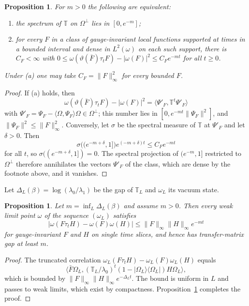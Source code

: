 \documentclass[aps,prd,twocolumn,superscriptaddress,nofootinbib,longbibliography,floatfix,amsmath,amssymb,10pt]{revtex4-2}
\newtheorem{proposition}[theorem]{Proposition}
\theoremstyle{definition}
\theoremstyle{remark}
\newcommand{\ip}[2]{\langle #1,#2\rangle}
\begin{document}
\begin{proposition}\label{prop:gapdecay}
For $m>0$ the following are equivalent:
\begin{enumerate}[label=\textup{(\alph*)},leftmargin=*]
\item the spectrum of $\mathbb T$ on $\Omega^\perp$ lies in $[0,e^{-m}]$;
\item for every $F$ in a class of gauge-invariant local functions supported
at times in a bounded interval and dense in $L^2(\omega)$ on each such support,
there is $C_F<\infty$ with $0\le\omega(\vartheta(\bar F)\tau_tF)-|\omega(F)|^2
\le C_Fe^{-mt}$ for all $t\ge0$.
\end{enumerate}
Under \textup{(a)} one may take $C_F=\|F\|_\infty^2$ for every bounded $F$.
\end{proposition}

\begin{proof}
If (a) holds, then
\[
\omega(\vartheta(\bar F)\tau_tF)-|\omega(F)|^2=\ip{\Psi'_F}{\mathbb
T^t\Psi'_F}
\]
with $\Psi'_F=\Psi_F-\ip\Omega{\Psi_F}\Omega\in\Omega^\perp$; this number lies
in $[0,e^{-mt}\|\Psi_F\|^2]$, and $\|\Psi_F\|^2\le\|F\|_\infty^2$.
Conversely, let $\sigma$ be the spectral measure of $\mathbb T$ at
$\Psi'_F$ and let $\delta>0$. Then
\[
\sigma\bigl((e^{-m+\delta},1]\bigr)e^{(-m+\delta)t}\le C_Fe^{-mt}
\]
for all $t$, so $\sigma((e^{-m+\delta},1])=0$.
The spectral projection of $(e^{-m},1]$ restricted to $\Omega^\perp$ therefore
annihilates the vectors $\Psi'_F$ of the class, which are dense by the
footnote above, and it vanishes.
\end{proof}

Let $\Delta_L(\beta)=\log(\lambda_0/\lambda_1)$ be the gap of $\mathbb T_L$ and
$\omega_L$ its vacuum state.

\begin{proposition}\label{prop:uniform}
Let $m=\inf_L\Delta_L(\beta)$ and assume $m>0$. Then every weak limit
point $\omega$ of the sequence $(\omega_L)$ satisfies
\[
|\omega(F\tau_tH)-\omega(F)\omega(H)|\le\|F\|_\infty\|H\|_\infty e^{-mt}
\]
for gauge-invariant $F$ and $H$ on single time slices, and hence has
transfer-matrix gap at least $m$.
\end{proposition}

\begin{proof}
The truncated correlation $\omega_L(F\tau_tH)-\omega_L(F)\omega_L(H)$ equals
\[
\bigl\langle\bar F\Omega_L,(\mathbb T_L/\lambda_0)^t(1-|\Omega_L\rangle
\langle\Omega_L|)H\Omega_L\bigr\rangle,
\]
which is bounded by $\|F\|_\infty\|H\|_\infty
e^{-\Delta_Lt}$. The bound is uniform in $L$ and passes to weak limits, which
exist by compactness. Proposition~\ref{prop:gapdecay} completes the proof.
\end{proof}
\end{document}
